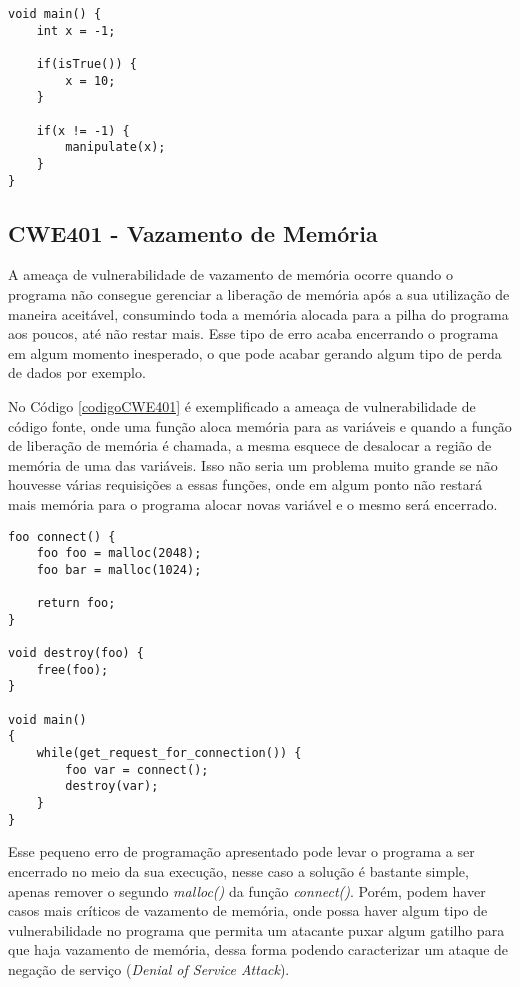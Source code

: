 \begin{lstlisting}[caption={Evitando ameaça de vulnerabilidade CWE457},
label=fixcwe457]
void main() {
    int x = -1;

    if(isTrue()) {
        x = 10;
    }

    if(x != -1) {
        manipulate(x);   
    }
}
\end{lstlisting}

\subsection{CWE401 - Vazamento de Memória}\label{cwe401}

A ameaça de vulnerabilidade de vazamento de memória ocorre quando o programa não
consegue gerenciar a liberação de memória após a sua utilização de maneira
aceitável, consumindo toda a memória alocada para a pilha do programa aos
poucos, até não restar mais. Esse tipo de erro acaba encerrando o programa em
algum momento inesperado, o que pode acabar gerando algum tipo de perda de dados
por exemplo.

No Código \ref{codigoCWE401} é exemplificado a ameaça de vulnerabilidade de
código fonte, onde uma função aloca memória para as variáveis e quando a função
de liberação de memória é chamada, a mesma esquece de desalocar a região de
memória de uma das variáveis. Isso não seria um problema muito grande se não
houvesse várias requisições a essas funções, onde em algum ponto não restará
mais memória para o programa alocar novas variável e o mesmo será encerrado.

\begin{lstlisting}[caption={Código exemplo CWE401}, label=codigoCWE401]
foo connect() {
    foo foo = malloc(2048);
    foo bar = malloc(1024);

    return foo;
}

void destroy(foo) {
    free(foo);
}

void main()
{
    while(get_request_for_connection()) {
        foo var = connect();
        destroy(var);
    }
}
\end{lstlisting}

Esse pequeno erro de programação apresentado pode levar o programa a ser
encerrado no meio da sua execução, nesse caso a solução é bastante simple,
apenas remover o segundo \textit{malloc()} da função \textit{connect()}. Porém,
podem haver casos mais críticos de vazamento de memória, onde possa haver algum
tipo de vulnerabilidade no programa que permita um atacante puxar algum gatilho
para que haja vazamento de memória, dessa forma podendo caracterizar um ataque
de negação de serviço (\textit{Denial of Service Attack}).

